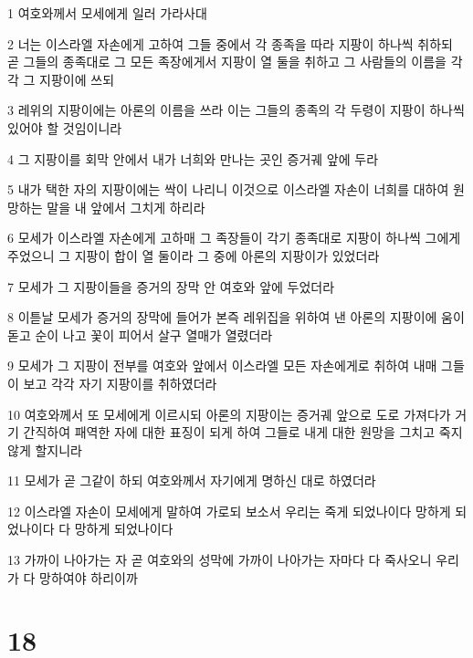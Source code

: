 \par 1 여호와께서 모세에게 일러 가라사대
\par 2 너는 이스라엘 자손에게 고하여 그들 중에서 각 종족을 따라 지팡이 하나씩 취하되 곧 그들의 종족대로 그 모든 족장에게서 지팡이 열 둘을 취하고 그 사람들의 이름을 각각 그 지팡이에 쓰되
\par 3 레위의 지팡이에는 아론의 이름을 쓰라 이는 그들의 종족의 각 두령이 지팡이 하나씩 있어야 할 것임이니라
\par 4 그 지팡이를 회막 안에서 내가 너희와 만나는 곳인 증거궤 앞에 두라
\par 5 내가 택한 자의 지팡이에는 싹이 나리니 이것으로 이스라엘 자손이 너희를 대하여 원망하는 말을 내 앞에서 그치게 하리라
\par 6 모세가 이스라엘 자손에게 고하매 그 족장들이 각기 종족대로 지팡이 하나씩 그에게 주었으니 그 지팡이 합이 열 둘이라 그 중에 아론의 지팡이가 있었더라
\par 7 모세가 그 지팡이들을 증거의 장막 안 여호와 앞에 두었더라
\par 8 이튿날 모세가 증거의 장막에 들어가 본즉 레위집을 위하여 낸 아론의 지팡이에 움이 돋고 순이 나고 꽃이 피어서 살구 열매가 열렸더라
\par 9 모세가 그 지팡이 전부를 여호와 앞에서 이스라엘 모든 자손에게로 취하여 내매 그들이 보고 각각 자기 지팡이를 취하였더라
\par 10 여호와께서 또 모세에게 이르시되 아론의 지팡이는 증거궤 앞으로 도로 가져다가 거기 간직하여 패역한 자에 대한 표징이 되게 하여 그들로 내게 대한 원망을 그치고 죽지 않게 할지니라
\par 11 모세가 곧 그같이 하되 여호와께서 자기에게 명하신 대로 하였더라
\par 12 이스라엘 자손이 모세에게 말하여 가로되 보소서 우리는 죽게 되었나이다 망하게 되었나이다 다 망하게 되었나이다
\par 13 가까이 나아가는 자 곧 여호와의 성막에 가까이 나아가는 자마다 다 죽사오니 우리가 다 망하여야 하리이까

\chapter{18}

